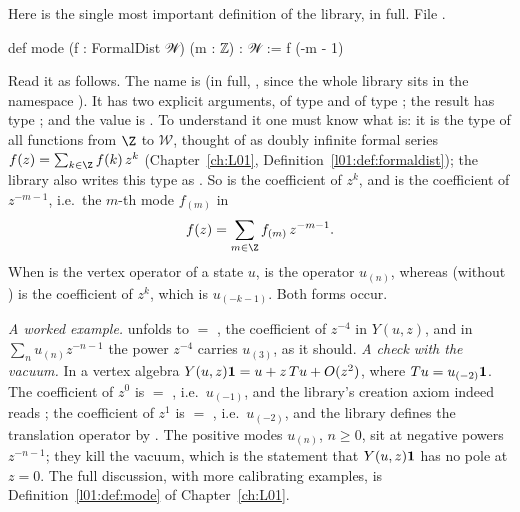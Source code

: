 \begin{example}\label{ch01:ex:mode}
Here is the single most important definition of the library, in full.
\noindent File .
\begin{leancode}
def mode (f : FormalDist 𝒲) (m : ℤ) : 𝒲 := f (-m - 1)
\end{leancode}
Read it as follows. The name is  (in full, , since the whole library sits
in the namespace ). It has two explicit arguments,  of type 
and  of type ; the result has type ; and the value is .
To understand it one must know what  is: it is the type  of all
functions from $\Z$ to $\mathcal W$, thought of as doubly infinite formal series
$f(z) = \sum_{k\in\Z} f(k)\,z^{k}$ (Chapter~\ref{ch:L01}, Definition~\ref{l01:def:formaldist});
the library also writes this type as . So  is the coefficient of $z^k$, and
 is the coefficient of $z^{-m-1}$, i.e.\ the $m$-th mode $f_{(m)}$ in
\begin{equation*}
  f(z) = \sum_{m\in\Z} f_{(m)}\, z^{-m-1}.
\end{equation*}
When  is the vertex operator  of a state $u$,  is the operator
$u_{(n)}$, whereas  (without ) is the coefficient of $z^k$, which is
$u_{(-k-1)}$. Both forms occur.

\emph{A worked example.}  unfolds to  $=$ , the
coefficient of $z^{-4}$ in $Y(u,z)$, and in $\sum_n u_{(n)}z^{-n-1}$ the power $z^{-4}$ carries
$u_{(3)}$, as it should. \emph{A check with the vacuum.} In a vertex algebra
$Y(u,z)\mathbf{1} = u + z\,Tu + O(z^2)$, where $Tu = u_{(-2)}\mathbf{1}$. The coefficient of $z^0$ is
 $=$ , i.e.\ $u_{(-1)}$, and the library's creation axiom indeed
reads ; the coefficient of $z^1$ is  $=$
, i.e.\ $u_{(-2)}$, and the library defines the translation operator by
. The positive modes $u_{(n)}$, $n\ge0$, sit at negative powers
$z^{-n-1}$; they kill the vacuum, which is the statement that $Y(u,z)\mathbf{1}$ has no pole at $z=0$.
The full discussion, with more calibrating examples, is Definition~\ref{l01:def:mode} of
Chapter~\ref{ch:L01}.
\end{example}

